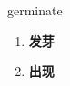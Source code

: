 
\begin{frame}
{\huge germinate}
\begin{center}
\begin{enumerate}\Large
  \item \textbf{发芽}
  \item \textbf{出现}
\end{enumerate}
\end{center}
\end{frame}
